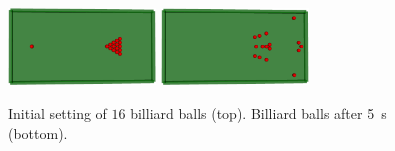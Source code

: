 \begin{figure}[h]
	\centering
	\includegraphics[width=0.35\textwidth]{figures/billiardTableInitial.png}
    \includegraphics[width=0.35\textwidth]{figures/billiardTable.png}
	\caption{Initial setting of $16$ billiard balls (top). Billiard balls after \SI{5}{\second} (bottom).}
	\label{fig:billiardTable}
\end{figure}
\begin{table}[h]
	\begin{center}
\label{table:billiardTableMaterials} 
	\end{center}
\end{table}
%











